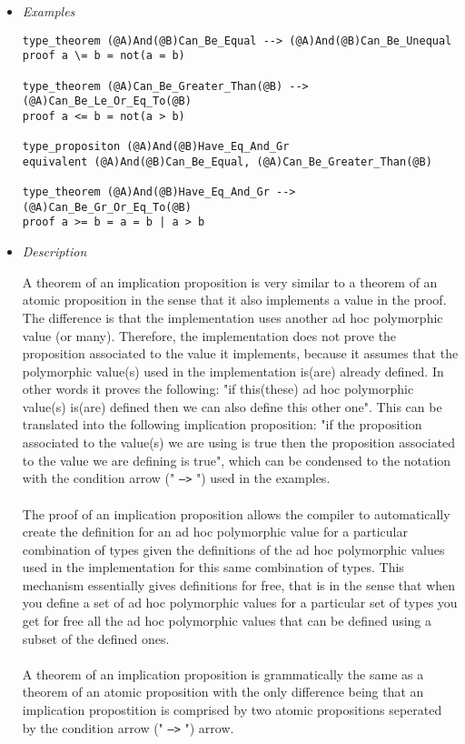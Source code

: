 \documentclass{article}
\begin{document}
\begin{itemize}
\item \textit{Examples}

\begin{verbatim}
type_theorem (@A)And(@B)Can_Be_Equal --> (@A)And(@B)Can_Be_Unequal
proof a \= b = not(a = b)

type_theorem (@A)Can_Be_Greater_Than(@B) --> (@A)Can_Be_Le_Or_Eq_To(@B)
proof a <= b = not(a > b)

type_propositon (@A)And(@B)Have_Eq_And_Gr
equivalent (@A)And(@B)Can_Be_Equal, (@A)Can_Be_Greater_Than(@B)

type_theorem (@A)And(@B)Have_Eq_And_Gr --> (@A)Can_Be_Gr_Or_Eq_To(@B)
proof a >= b = a = b | a > b
\end{verbatim}

\item \textit{Description}

A theorem of an implication proposition is very similar to a theorem of an
atomic proposition in the sense that it also implements a value in the proof.
The difference is that the implementation uses another ad hoc polymorphic value
(or many). Therefore, the implementation does not prove the proposition
associated to the value it implements, because it assumes that the polymorphic
value(s) used in the implementation is(are) already defined. In other words it
proves the following: "if this(these) ad hoc polymorphic value(s) is(are)
defined then we can also define this other one". This can be translated into
the following implication proposition: "if the proposition associated to the
value(s) we are using is true then the proposition associated to the value we
are defining is true", which can be condensed to the notation with the
condition arrow (" \texttt{-->} ") used in the examples.
\\\\
The proof of an implication proposition allows the compiler to
automatically create the definition for an ad hoc polymorphic value for a
particular combination of types given the definitions of the ad hoc polymorphic
values used in the implementation for this same combination of types. This
mechanism essentially gives definitions for free, that is in the sense that
when you define a set of ad hoc polymorphic values for a particular set of
types you get for free all the ad hoc polymorphic values that can be defined
using a subset of the defined ones. 
\\\\
A theorem of an implication proposition is grammatically the same as
a theorem of an atomic proposition with the only difference being that an 
implication propostition is comprised by two atomic propositions seperated by
the condition arrow (" \texttt{-->} ") arrow.

\end{itemize}
\end{document}

